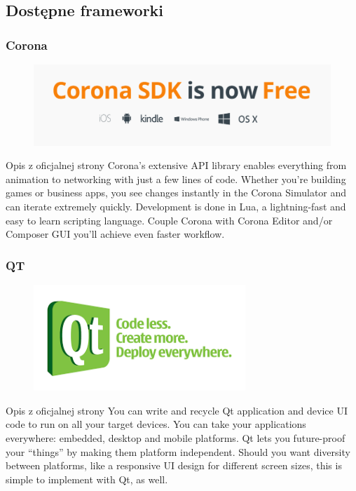 \documentclass{beamer}
\begin{document}
\subsection{Dostępne frameworki}
\begin{frame}
\frametitle{Corona}
\begin{figure}
 \includegraphics[width=12cm,valign=t]{corona.png}
 \end{figure}
 \begin{block}{Opis z oficjalnej strony }
Corona's extensive API library enables everything from animation to networking with just a few lines of code. Whether you're building games or business apps, you see changes instantly in the Corona Simulator and can iterate extremely quickly. Development is done in Lua, a lightning-fast and easy to learn scripting language. Couple Corona with Corona Editor and/or Composer GUI you'll achieve even faster workflow. 
 \end{block}
\end{frame}

\begin{frame}
\frametitle{QT}
\begin{figure}
 \includegraphics[width=8cm,valign=t]{qt.png}
 \end{figure}
 \begin{block}{Opis z oficjalnej strony }
You can write and recycle Qt application and device UI code to run on all your target devices. You can take your applications everywhere: embedded, desktop and mobile platforms. Qt lets you future-proof your “things” by making them platform independent. Should you want diversity between platforms, like a responsive UI design for different screen sizes, this is simple to implement with Qt, as well.
 \end{block}
\end{frame}
\end{document}
